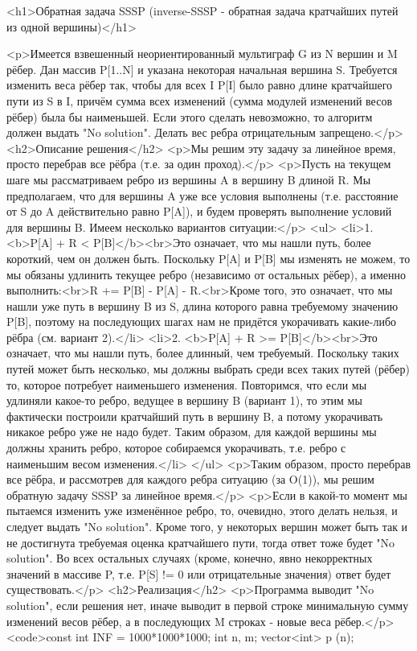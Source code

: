 <h1>Обратная задача SSSP (inverse-SSSP - обратная задача кратчайших путей из одной вершины)</h1>

<p>Имеется взвешенный неориентированный мультиграф G из N вершин и M рёбер. Дан массив P[1..N] и указана некоторая начальная вершина S. Требуется изменить веса рёбер так, чтобы для всех I P[I] было равно длине кратчайшего пути из S в I, причём сумма всех изменений (сумма модулей изменений весов рёбер) была бы наименьшей. Если этого сделать невозможно, то алгоритм должен выдать "No solution". Делать вес ребра отрицательным запрещено.</p>
<h2>Описание решения</h2>
<p>Мы решим эту задачу за линейное время, просто перебрав все рёбра (т.е. за один проход).</p>
<p>Пусть на текущем шаге мы рассматриваем ребро из вершины A в вершину B длиной R. Мы предполагаем, что для вершины A уже все условия выполнены (т.е. расстояние от S до A действительно равно P[A]), и будем проверять выполнение условий для вершины B. Имеем несколько вариантов ситуации:</p>
<ul>
<li>1. <b>P[A] + R < P[B]</b><br>Это означает, что мы нашли путь, более короткий, чем он должен быть. Поскольку P[A] и P[B] мы изменять не можем, то мы обязаны удлинить текущее ребро (независимо от остальных рёбер), а именно выполнить:<br>R += P[B] - P[A] - R.<br>Кроме того, это означает, что мы нашли уже путь в вершину B из S, длина которого равна требуемому значению P[B], поэтому на последующих шагах нам не придётся укорачивать какие-либо рёбра (см. вариант 2).</li>
<li>2. <b>P[A] + R >= P[B]</b><br>Это означает, что мы нашли путь, более длинный, чем требуемый. Поскольку таких путей может быть несколько, мы должны выбрать среди всех таких путей (рёбер) то, которое потребует наименьшего изменения. Повторимся, что если мы удлиняли какое-то ребро, ведущее в вершину B (вариант 1), то этим мы фактически построили кратчайший путь в вершину B, а потому укорачивать никакое ребро уже не надо будет. Таким образом, для каждой вершины мы должны хранить ребро, которое собираемся укорачивать, т.е. ребро с наименьшим весом изменения.</li>
</ul>
<p>Таким образом, просто перебрав все рёбра, и рассмотрев для каждого ребра ситуацию (за O(1)), мы решим обратную задачу SSSP за линейное время.</p>
<p>Если в какой-то момент мы пытаемся изменить уже изменённое ребро, то, очевидно, этого делать нельзя, и следует выдать "No solution". Кроме того, у некоторых вершин может быть так и не достигнута требуемая оценка кратчайшего пути, тогда ответ тоже будет "No solution". Во всех остальных случаях (кроме, конечно, явно некорректных значений в массиве P, т.е. P[S] != 0 или отрицательные значения) ответ будет существовать.</p>
<h2>Реализация</h2>
<p>Программа выводит "No solution", если решения нет, иначе выводит в первой строке минимальную сумму изменений весов рёбер, а в последующих M строках - новые веса рёбер.</p>
<code>const int INF = 1000*1000*1000;
int n, m;
vector<int> p (n);

